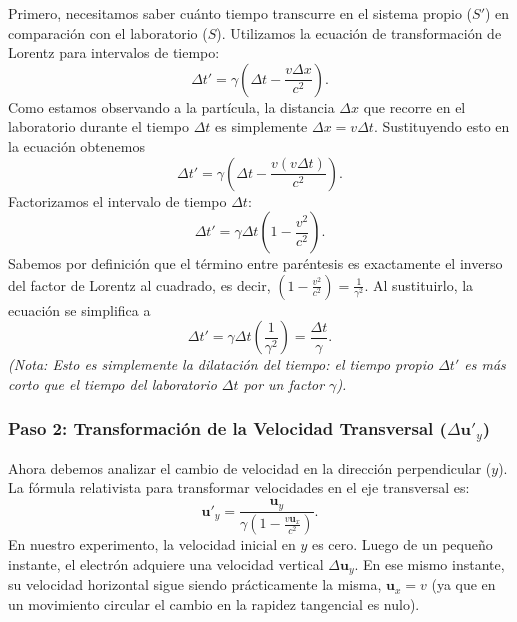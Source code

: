 \documentclass[11pt,a4paper]{book}
\begin{document}
Primero, necesitamos saber cuánto tiempo transcurre en el sistema propio ($S'$) en comparación con el laboratorio ($S$). Utilizamos la ecuación de transformación de Lorentz para intervalos de tiempo:
\begin{equation}
    \Delta t' = \gamma \left( \Delta t - \frac{v \Delta x}{c^2} \right).
\end{equation}
Como estamos observando a la partícula, la distancia $\Delta x$ que recorre en el laboratorio durante el tiempo $\Delta t$ es simplemente $\Delta x = v \Delta t$. Sustituyendo esto en la ecuación obtenemos
\begin{equation}
    \Delta t' = \gamma \left( \Delta t - \frac{v (v \Delta t)}{c^2} \right).
\end{equation}
Factorizamos el intervalo de tiempo $\Delta t$:
\begin{equation}
    \Delta t' = \gamma \Delta t \left( 1 - \frac{v^2}{c^2} \right).
\end{equation}
Sabemos por definición que el término entre paréntesis es exactamente el inverso del factor de Lorentz al cuadrado, es decir, $\left(1 - \frac{v^2}{c^2}\right) = \frac{1}{\gamma^2}$. Al sustituirlo, la ecuación se simplifica a
\begin{equation}
    \Delta t' = \gamma \Delta t \left( \frac{1}{\gamma^2} \right) = \frac{\Delta t}{\gamma}.
    \label{eq:delta_t_algebraico}
\end{equation}
\textit{(Nota: Esto es simplemente la dilatación del tiempo: el tiempo propio $\Delta t'$ es más corto que el tiempo del laboratorio $\Delta t$ por un factor $\gamma$).}

\subsubsection{Paso 2: Transformación de la Velocidad Transversal ($\Delta \boldsymbol{u}'_y$)}

Ahora debemos analizar el cambio de velocidad en la dirección perpendicular ($y$). La fórmula relativista para transformar velocidades en el eje transversal es:
\begin{equation}
    \boldsymbol{u}'_y = \frac{\boldsymbol{u}_y}{\gamma \left( 1 - \frac{v \boldsymbol{u}_x}{c^2} \right)}.
\end{equation}
En nuestro experimento, la velocidad inicial en $y$ es cero. Luego de un pequeño instante, el electrón adquiere una velocidad vertical $\Delta \boldsymbol{u}_y$. En ese mismo instante, su velocidad horizontal sigue siendo prácticamente la misma, $\boldsymbol{u}_x = v$ (ya que en un movimiento circular el cambio en la rapidez tangencial es nulo).
\end{document}
